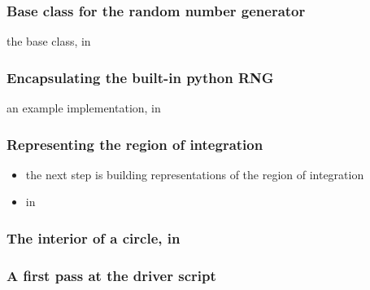 \begin{frame}[fragile]
%
  \frametitle{Base class for the random number generator}
%
  the base class, in 
%
%
\end{frame}

\begin{frame}[fragile]
%
  \frametitle{Encapsulating the built-in python RNG}
%
  an example implementation, in 
%
%
\end{frame}

\begin{frame}[fragile]
%
  \frametitle{Representing the region of integration}
%
  \begin{itemize}
  \item the next step is building representations of the region of integration
  \item in 
  \end{itemize}
%
%
\end{frame}

\begin{frame}[fragile]
%
  \frametitle{The interior of a circle, in }
%
%
\end{frame}

\begin{frame}[fragile]
%
  \frametitle{A first pass at the driver script}
%
%
\end{frame}

